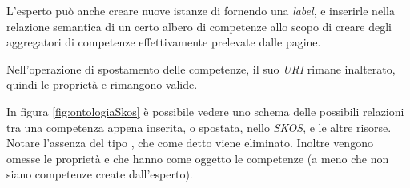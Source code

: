 \documentclass[tesi.tex]{subfiles}
\begin{document}
L'esperto pu\`o anche creare nuove istanze di 
fornendo una \emph{label}, e inserirle nella relazione semantica di un
certo albero di competenze allo scopo di creare degli aggregatori di
competenze effettivamente prelevate dalle pagine.

Nell'operazione di spostamento delle competenze, il suo \emph{URI}
rimane inalterato, quindi le propriet\`a  e
 rimangono valide.

In figura \ref{fig:ontologiaSkos} \`e possibile vedere uno schema
delle possibili relazioni tra una competenza appena inserita, o
spostata, nello \emph{SKOS}, e le altre risorse. Notare
l'assenza del tipo , che come detto viene
eliminato. Inoltre vengono omesse le propriet\`a  e
 che hanno come oggetto le competenze (a meno che
non siano competenze create dall'esperto).
\end{document}
